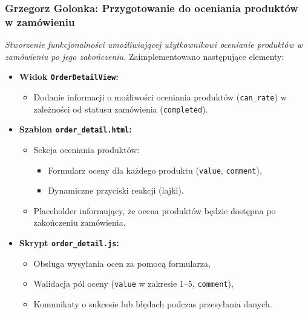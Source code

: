 \documentclass[12pt,a4paper,oneside]{article}
\theoremstyle{definition}
\numberwithin{equation}{section}
\begin{document}
\subsubsection{Grzegorz Golonka: Przygotowanie do oceniania produktów w zamówieniu}
\label{section:1.3.30}
\textit{
Stworzenie funkcjonalności umożliwiającej użytkownikowi ocenianie produktów w zamówieniu po jego zakończeniu.
}
Zaimplementowano następujące elementy:
\begin{itemize}
    \item \textbf{Widok \texttt{OrderDetailView}:}
    \begin{itemize}
        \item Dodanie informacji o możliwości oceniania produktów (\texttt{can\_rate}) w zależności od statusu zamówienia (\texttt{completed}).
    \end{itemize}
    \item \textbf{Szablon \texttt{order\_detail.html}:}
    \begin{itemize}
        \item Sekcja oceniania produktów:
        \begin{itemize}
            \item Formularz oceny dla każdego produktu (\texttt{value}, \texttt{comment}),
            \item Dynamiczne przyciski reakcji (lajki).
        \end{itemize}
        \item Placeholder informujący, że ocena produktów będzie dostępna po zakończeniu zamówienia.
    \end{itemize}
    \item \textbf{Skrypt \texttt{order\_detail.js}:}
    \begin{itemize}
        \item Obsługa wysyłania ocen za pomocą formularza,
        \item Walidacja pól oceny (\texttt{value} w zakresie 1–5, \texttt{comment}),
        \item Komunikaty o sukcesie lub błędach podczas przesyłania danych.
    \end{itemize}
\end{itemize}
%
%
%
\end{document}

